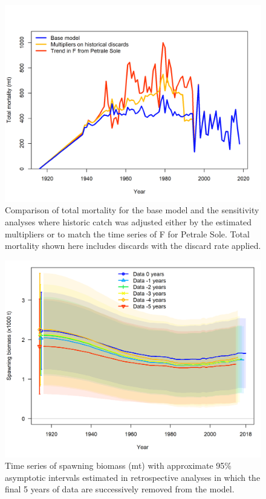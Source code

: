 \documentclass[12pt,]{article}
\begin{document}
\begin{figure}
\centering
\includegraphics{Figures/adjusted_historic_catch_comparison.png}
\caption{Comparison of total mortality for the base model and the
sensitivity analyses where historic catch was adjusted either by the
estimated multipliers or to match the time series of F for Petrale Sole.
Total mortality shown here includes discards with the discard rate
applied. \label{fig:adjusted_historic_catch_comparison}}
\end{figure}

\FloatBarrier

\begin{figure}
\centering
\includegraphics{Figures/retro_compare2_spawnbio_uncertainty.png}
\caption{Time series of spawning biomass (mt) with approximate 95\%
asymptotic intervals estimated in retrospective analyses in which the
final 5 years of data are successively removed from the
model.\label{fig:retro}}
\end{figure}
\end{document}
